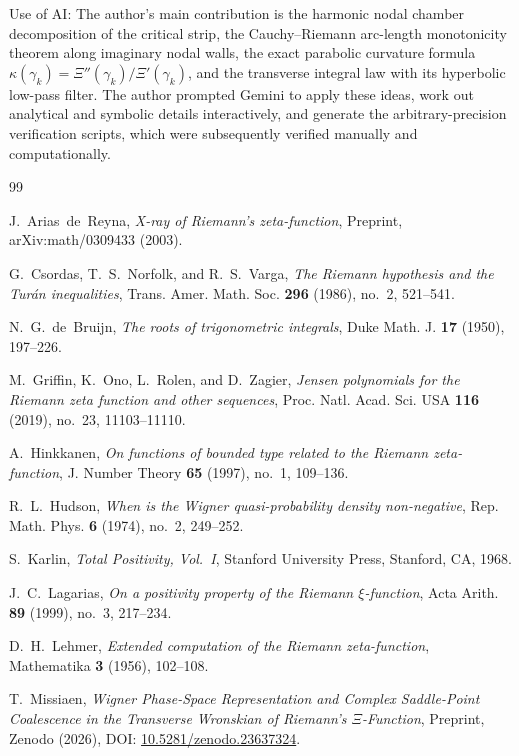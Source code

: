 \documentclass[11pt,a4paper,reqno]{amsart}
\theoremstyle{definition}
\theoremstyle{remark}
\numberwithin{equation}{section}
\begin{document}
Use of AI: The author's main contribution is the harmonic nodal chamber decomposition of the critical strip, the Cauchy--Riemann arc-length monotonicity theorem along imaginary nodal walls, the exact parabolic curvature formula $\kappa(\gamma_k) = \Xi''(\gamma_k)/\Xi'(\gamma_k)$, and the transverse integral law with its hyperbolic low-pass filter. The author prompted Gemini to apply these ideas, work out analytical and symbolic details interactively, and generate the arbitrary-precision verification scripts, which were subsequently verified manually and computationally.

\begin{thebibliography}{99}

J.~Arias~de~Reyna, \emph{X-ray of Riemann's zeta-function}, Preprint, arXiv:math/0309433 (2003).

G.~Csordas, T.~S.~Norfolk, and R.~S.~Varga, \emph{The Riemann hypothesis and the Tur\'an inequalities}, Trans. Amer. Math. Soc. \textbf{296} (1986), no.~2, 521--541.

N.~G.~de~Bruijn, \emph{The roots of trigonometric integrals}, Duke Math. J. \textbf{17} (1950), 197--226.

M.~Griffin, K.~Ono, L.~Rolen, and D.~Zagier, \emph{Jensen polynomials for the Riemann zeta function and other sequences}, Proc. Natl. Acad. Sci. USA \textbf{116} (2019), no.~23, 11103--11110.

A.~Hinkkanen, \emph{On functions of bounded type related to the Riemann zeta-function}, J. Number Theory \textbf{65} (1997), no.~1, 109--136.

R.~L.~Hudson, \emph{When is the Wigner quasi-probability density non-negative}, Rep. Math. Phys. \textbf{6} (1974), no.~2, 249--252.

S.~Karlin, \emph{Total Positivity, Vol.~I}, Stanford University Press, Stanford, CA, 1968.

J.~C.~Lagarias, \emph{On a positivity property of the Riemann $\xi$-function}, Acta Arith. \textbf{89} (1999), no.~3, 217--234.

D.~H.~Lehmer, \emph{Extended computation of the Riemann zeta-function}, Mathematika \textbf{3} (1956), 102--108.

T.~Missiaen, \emph{Wigner Phase-Space Representation and Complex Saddle-Point Coalescence in the Transverse Wronskian of Riemann's $\Xi$-Function}, Preprint, Zenodo (2026), DOI: \href{https://doi.org/10.5281/zenodo.23637324}{10.5281/zenodo.23637324}.


\end{thebibliography}
\end{document}
